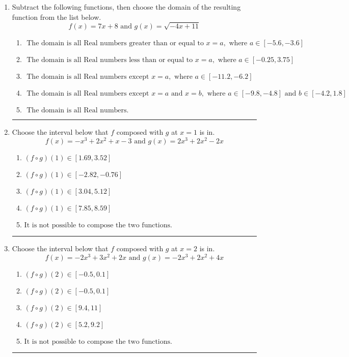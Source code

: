 \documentclass[14pt]{extbook}
\newcommand{\litem}[1]{\item#1\hspace*{-1cm}\rule{\textwidth}{0.4pt}}
\begin{document}
\begin{enumerate}
{\begin{enumerate}[label=\Alph*.]
\end{enumerate} }
\litem{
Subtract the following functions, then choose the domain of the resulting function from the list below.\[ f(x) = 7x + 8 \text{ and } g(x) = \sqrt{-4x+11}  \]\begin{enumerate}[label=\Alph*.]
\item \( \text{ The domain is all Real numbers greater than or equal to } x = a, \text{ where } a \in [-5.6, -3.6] \)
\item \( \text{ The domain is all Real numbers less than or equal to } x = a, \text{ where } a \in [-0.25, 3.75] \)
\item \( \text{ The domain is all Real numbers except } x = a, \text{ where } a \in [-11.2, -6.2] \)
\item \( \text{ The domain is all Real numbers except } x = a \text{ and } x = b, \text{ where } a \in [-9.8, -4.8] \text{ and } b \in [-4.2, 1.8] \)
\item \( \text{ The domain is all Real numbers. } \)

\end{enumerate} }
\litem{
Choose the interval below that $f$ composed with $g$ at $x=1$ is in.\[ f(x) = -x^{3} +2 x^{2} +x -3 \text{ and } g(x) = 2x^{3} +2 x^{2} -2 x \]\begin{enumerate}[label=\Alph*.]
\item \( (f \circ g)(1) \in [1.69, 3.52] \)
\item \( (f \circ g)(1) \in [-2.82, -0.76] \)
\item \( (f \circ g)(1) \in [3.04, 5.12] \)
\item \( (f \circ g)(1) \in [7.85, 8.59] \)
\item \( \text{It is not possible to compose the two functions.} \)

\end{enumerate} }
\litem{
Choose the interval below that $f$ composed with $g$ at $x=2$ is in.\[ f(x) = -2x^{3} +3 x^{2} +2 x \text{ and } g(x) = -2x^{3} +2 x^{2} +4 x \]\begin{enumerate}[label=\Alph*.]
\item \( (f \circ g)(2) \in [-0.5, 0.1] \)
\item \( (f \circ g)(2) \in [-0.5, 0.1] \)
\item \( (f \circ g)(2) \in [9.4, 11] \)
\item \( (f \circ g)(2) \in [5.2, 9.2] \)
\item \( \text{It is not possible to compose the two functions.} \)


\end{enumerate}}
\end{enumerate}
\end{document}
